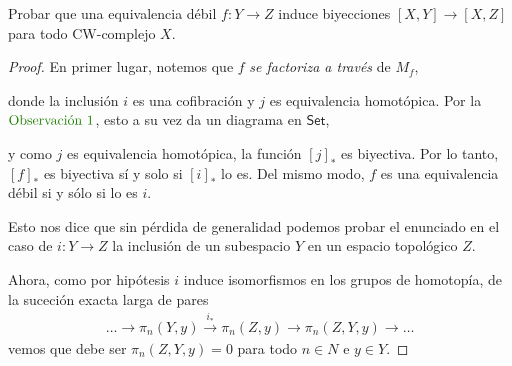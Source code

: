 \documentclass[11pt]{article}
\newcommand{\cat}[1]{\mathsf{#1}}
\newcommand{\paint}[1]{\color{color}{#1}}
\newenvironment{exercise}[2][Ejercicio]{\begin{trivlist}
\item[\hskip \labelsep \paint{{\bfseries #1}}\hskip \labelsep {\bfseries #2.}]}{\end{trivlist}}
\begin{document}
\begin{exercise}{4} Probar que una equivalencia débil $f : Y \to Z$ induce biyecciones $[X,Y] \to [X,Z]$ para todo CW-complejo $X$.
\end{exercise}
\begin{proof} En primer lugar, notemos que $f$ \textit{se factoriza a través} de $M_f$, 
\begin{center}
\end{center}
donde la inclusión $i$ es una cofibración y $j$ es equivalencia homotópica. Por la $\paint{\text{Observación $1$}}$, esto a su vez da un diagrama en $\cat{Set}$,
\begin{center}
\end{center}

y como $j$ es equivalencia homotópica, la función $[j]_*$ es biyectiva. Por lo tanto, $[f]_*$ es biyectiva sí y solo si $[i]_*$ lo es. Del mismo modo, $f$ es una equivalencia débil si y sólo si lo es $i$. 

Esto nos dice que sin pérdida de generalidad podemos probar el enunciado en el caso de $i : Y \to Z$ la inclusión de un subespacio $Y$ en un espacio topológico $Z$.

Ahora, como por hipótesis $i$ induce isomorfismos en los grupos de homotopía, de la suceción exacta larga de pares
\begin{align*}
\dots \to \pi_n(Y,y) \xrightarrow{i_*} \pi_n(Z,y) \to \pi_n(Z,Y,y) \to \dots
\end{align*}
vemos que debe ser $\pi_n(Z,Y,y) = 0$ para todo $n \in N$ e $y \in Y$.	


\end{proof}
\end{document}
